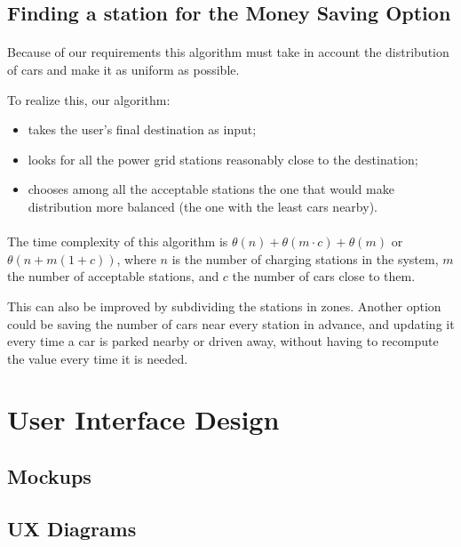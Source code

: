 \documentclass[english]{article}
\begin{document}
\newpage
\subsection{Finding a station for the Money Saving Option}

	

\paragraph{}
Because of our requirements this algorithm must take in account the distribution of cars and make it as uniform as possible.

To realize this, our algorithm:
\begin{itemize}
	\item{takes the user's final destination as input;}
	\item{looks for all the power grid stations reasonably close to the destination;}
	\item{chooses among all the acceptable stations the one that would make distribution more balanced (the one with the least cars nearby).}
\end{itemize}

\paragraph{}
The time complexity of this algorithm is $\theta(n) + \theta(m \cdot c) + \theta(m)$ or $\theta(n + m (1+c))$, where $n$ is the number of charging stations in the system, $m$ the number of acceptable stations, and $c$ the number of cars close to them.

This can also be improved by subdividing the stations in zones.
Another option could be saving the number of cars near every station in advance, and updating it every time a car is parked nearby or driven away, without having to recompute the value every time it is needed.

\newpage

\section{User Interface Design}

\subsection{Mockups}

\subsection{UX Diagrams}
\end{document}
